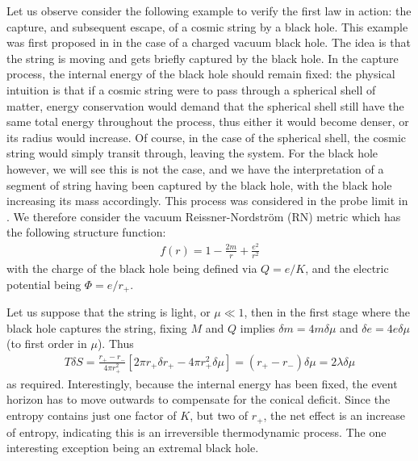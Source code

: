 \documentclass[
twoside,
openright,
frontopenright,
]{dmathesis}
\begin{document}
Let us observe consider the following example to verify the first law in action:
the capture, and subsequent escape, of a cosmic string by a black hole.  This
example was first proposed in \cite{Bonjour:1998rf} in the case of a charged
vacuum black hole.  The idea is that the string is moving and gets briefly
captured by the black hole. In the capture process, the internal energy of the
black hole should remain fixed: the physical intuition is that if a cosmic
string were to pass through a spherical shell of matter, energy conservation
would demand that the spherical shell still have the same total energy
throughout the process, thus either it would become denser, or its radius would
increase.  Of course, in the case of the spherical shell, the cosmic string
would simply transit through, leaving the system. For the black hole however, we
will see this is not the case, and we have the interpretation of a segment of
string having been captured by the black hole, with the black hole increasing
its mass accordingly. This process was considered in the probe limit in
\cite{Lonsdale:1988xd,DeVilliers:1997nk}. We therefore consider the vacuum
Reissner-Nordstr\"om (RN) metric which has the following structure function:
\begin{align}
f(r) = 1  - \frac{2m}{r} + \frac{e^2}{r^2}
\end{align}
with the charge of the black hole being defined via $Q = e/K$, and the electric
potential being $\Phi = e/r_+$.

Let us suppose that the string is light, or $\mu \ll 1$, then in the first stage
where the black hole captures the string, fixing $M$ and $Q$ implies
$\delta m = 4 m \delta \mu$ and $\delta e = 4e\delta \mu$ (to first order in
$\mu$). Thus
\begin{align}
T \delta S = \frac{r_+-r_-}{4\pi r_+^2} \left [
2\pi r_+ \delta r_+ - 4\pi r_+^2 \delta\mu \right ]
= (r_+-r_-) \delta \mu = 2\lambda \delta \mu
\end{align}
as required. Interestingly, because the internal energy has been fixed, the
event horizon has to move outwards to compensate for the conical deficit. Since
the entropy contains just one factor of $K$, but two of $r_+$, the net effect is
an increase of entropy, indicating this is an irreversible thermodynamic
process. The one interesting exception being an extremal black hole.
\end{document}
